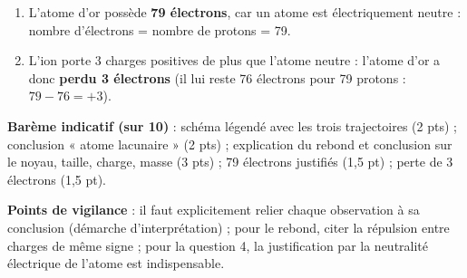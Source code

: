 \documentclass[11pt]{article}
\begin{document}
\begin{corrige}
\begin{enumerate}
\item L'atome d'or possède \textbf{79 électrons}, car un atome est électriquement neutre : nombre d'électrons = nombre de protons = 79.
\item L'ion  porte 3 charges positives de plus que l'atome neutre : l'atome d'or a donc \textbf{perdu 3 électrons} (il lui reste 76 électrons pour 79 protons : $79 - 76 = +3$).
\end{enumerate}
\textbf{Barème indicatif (sur 10)} : schéma légendé avec les trois trajectoires (2 pts) ; conclusion « atome lacunaire » (2 pts) ; explication du rebond et conclusion sur le noyau, taille, charge, masse (3 pts) ; 79 électrons justifiés (1,5 pt) ; perte de 3 électrons (1,5 pt).

\textbf{Points de vigilance} : il faut explicitement relier chaque observation à sa conclusion (démarche d'interprétation) ; pour le rebond, citer la répulsion entre charges de même signe ; pour la question 4, la justification par la neutralité électrique de l'atome est indispensable.
\end{corrige}
\end{document}
